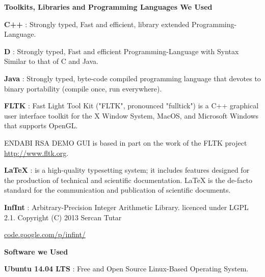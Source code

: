 \documentclass{slides}
\begin{document}





\newpage
\begin{center}
\textbf{\Large Toolkits, Libraries and Programming Languages We Used}
\end{center}
\begin{center}
\textbf{C++} : Strongly typed, Fast and efficient, library extended Programming-Language.
\end{center}
\begin{center}
\textbf{D} : Strongly typed, Fast and efficient Programming-Language with Syntax Similar to that of C and Java.
\end{center}
\begin{center}
\textbf{Java} : Strongly typed, byte-code compiled programming language that devotes to binary portability (compile once, run everywhere).
\end{center}
\begin{center}
\textbf{FLTK} : Fast Light Tool Kit ("FLTK", pronounced "fulltick") is a C++ graphical user interface toolkit for the X Window System, MacOS, and Microsoft  Windows that supports OpenGL.
\end{center}
\begin{center}
\textup{ENDABI RSA DEMO GUI} is based in  part  on  the  work  of  the  FLTK project \url{http://www.fltk.org}.
\end{center}
\newpage
\begin{center}
\textbf{LaTeX} : is a high-quality typesetting system; it includes features designed for the production of technical and scientific documentation. LaTeX is the de-facto standard for the communication and publication of scientific documents. 
\end{center}
\begin{center}
\textbf{InfInt} : Arbitrary-Precision Integer Arithmetic Library. licenced under LGPL 2.1. Copyright (C) 2013 Sercan Tutar
\end{center}
\begin{center}
\url{code.google.com/p/infint/}
\end{center}
\newpage
\begin{center}
\textbf{\Large Software we Used}
\end{center}
\begin{center}
\textbf{Ubuntu 14.04 LTS} : Free and Open Source Linux-Based Operating System.
\end{center}
\end{document}
